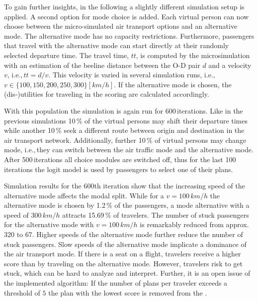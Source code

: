 To gain further insights, in the following a slightly different simulation setup is applied. 
A second option for mode choice is added. 
Each virtual person can now choose between the micro-simulated air transport options and an alternative mode. 
The alternative mode has no capacity restrictions. 
Furthermore, passengers that travel with the alternative mode can start directly at their randomly selected departure time. 
The travel time, $tt$, is computed by the microsimulation with an estimation of the beeline distance between the O-D pair $d$ and a velocity $v$, i.e.,\,$tt = d / v$.  
This velocity is varied in several simulation runs, i.e.,\,$v \in \{100, 150, 200, 250, 300 \} [km/h]$. 
If the alternative mode is chosen, the (dis-)utilities for traveling in the scoring are calculated accordingly.  

With this population the simulation is again run for 600\,iterations. 
Like in the previous simulations 10\,\% of the virtual persons may shift their departure times while another 10\,\% seek a different route between origin and destination in the air transport network. 
Additionally, further 10\,\% of virtual persons may change mode, i.e.,\,they can switch between the air traffic mode and the alternative mode. 
After 500\,iterations all choice modules are switched off, thus for the last 100\,iterations the logit model is used by passengers to select one of their plans. 

Simulation results for the 600th iteration show that the 
increasing speed of the alternative mode affects the modal split. %
While for a $v = 100 \, km/h$ the alternative mode is chosen by 1.2\,\% of the passengers, a mode alternative with a speed of $300 \, km/h$ attracts 15.69\,\% of travelers. 
The number of stuck passengers for the alternative mode with $v = 100 \, km/h$ is remarkably reduced from approx.~$320$ to $67$. 
Higher speeds of the alternative mode further reduce the number of stuck passengers. 
Slow speeds of the alternative mode implicate a dominance of the air transport mode. 
If there is a seat on a flight, travelers receive a higher score than by traveling on the alternative mode. 
However, travelers risk to get stuck, which can be hard to analyze and interpret. 
Further, it is an open issue of the implemented algorithm: If the number of plans per traveler exceeds a threshold of $5$ the plan with the lowest score is removed from the . 


